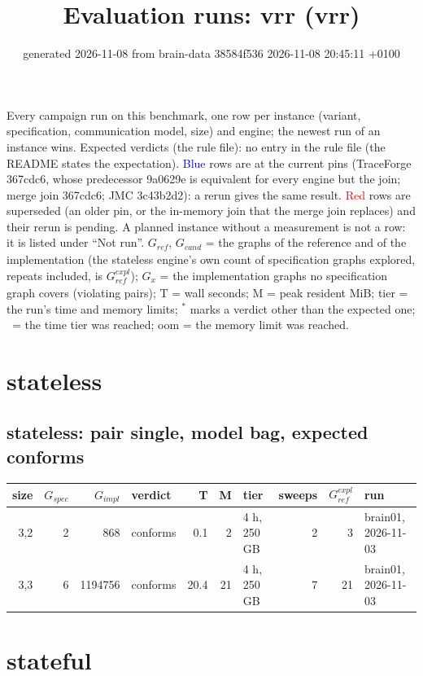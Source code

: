 \documentclass[10pt]{article}
\title{Evaluation runs: \textsf{vrr} (vrr)}
\author{}
\date{generated 2026-11-08 from brain-data 38584f536 2026-11-08 20:45:11 +0100}
\begin{document}
\maketitle\small
\noindent Every campaign run on this benchmark, one row per instance (variant, specification, communication model, size) and engine; the newest run of an instance wins. Expected verdicts (the rule file): no entry in the rule file (the README states the expectation). \textcolor{blue}{Blue} rows are at the current pins (TraceForge 367cdc6, whose predecessor 9a0629e is equivalent for every engine but the join; merge join 367cdc6; JMC 3c43b2d2): a rerun gives the same result. \textcolor{red}{Red} rows are superseded (an older pin, or the in-memory join that the merge join replaces) and their rerun is pending. A planned instance without a measurement is not a row: it is listed under ``Not run''. $G_{\mathit{ref}}$, $G_{\mathit{cand}}$ = the graphs of the reference and of the implementation (the stateless engine's own count of specification graphs explored, repeats included, is $G_{\mathit{ref}}^{\mathit{expl}}$); $G_x$ = the implementation graphs no specification graph covers (violating pairs); T = wall seconds; M = peak resident MiB; tier = the run's time and memory limits; $^{\ast}$ marks a verdict other than the expected one; \faClock\ = the time tier was reached; oom = the memory limit was reached.

\section*{stateless}
\subsection*{stateless: pair \textsf{single}, model bag, expected conforms}
\begin{longtable}{@{}rrrlrrlrrl@{}}
\toprule
size & $G_{\mathit{spec}}$ & $G_{\mathit{impl}}$ & verdict & T & M & tier & sweeps & $G_{\mathit{ref}}^{\mathit{expl}}$ & run \\
\midrule
\endhead
\color{blue} 3,2 & 2 & 868 & conforms & 0.1 & 2 & 4 h, 250 GB & 2 & 3 & brain01, 2026-11-03 \\
\color{blue} 3,3 & 6 & 1194756 & conforms & 20.4 & 21 & 4 h, 250 GB & 7 & 21 & brain01, 2026-11-03 \\
\bottomrule
\end{longtable}
\section*{stateful}
\end{document}
